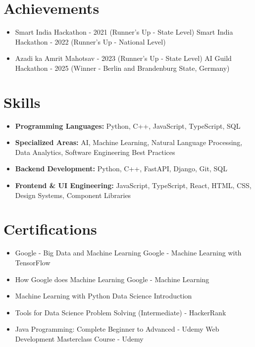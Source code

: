 \documentclass[a4paper,10pt]{article}
\begin{document}
\section*{Achievements}
\begin{itemize}
\item Smart India Hackathon - 2021 (Runner's Up - State Level) \hfill Smart India Hackathon - 2022 (Runner's Up - National Level)
\item Azadi ka Amrit Mahotsav - 2023 (Runner's Up - State Level) \hfill AI Guild Hackathon - 2025 (Winner - Berlin and Brandenburg State, Germany)
\end{itemize}

\section*{Skills}
\begin{itemize}
  \item \textbf{Programming Languages:} Python, C++, JavaScript, TypeScript, SQL
  \item \textbf{Specialized Areas:} AI, Machine Learning, Natural Language Processing, Data Analytics, Software Engineering Best Practices
  \item \textbf{Backend Development:} Python, C++, FastAPI, Django, Git, SQL
  \item \textbf{Frontend \& UI Engineering:} JavaScript, TypeScript, React, HTML, CSS, Design Systems, Component Libraries
\end{itemize}

\section*{Certifications}
\begin{itemize}
\item Google - Big Data and Machine Learning \hfill Google - Machine Learning with TensorFlow
\item How Google does Machine Learning \hfill Google - Machine Learning
\item Machine Learning with Python \hfill Data Science Introduction
\item Tools for Data Science \hfill Problem Solving (Intermediate) - HackerRank
\item Java Programming: Complete Beginner to Advanced - Udemy \hfill Web Development Masterclass Course - Udemy
\end{itemize}
\end{document}
